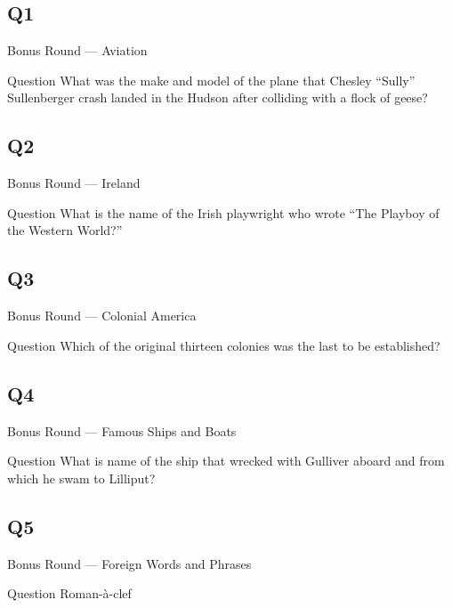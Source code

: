 \documentclass[11pt]{beamer}
\begin{document}
\subsection*{Q1}
\begin{frame}[t]{Bonus Round --- Aviation}
\vspace{-0.5em}
\begin{block}{Question}
What was the make and model of the plane that Chesley ``Sully'' Sullenberger crash landed in the Hudson after colliding with a flock of geese?
\end{block}
\end{frame}
\subsection*{Q2}
\begin{frame}[t]{Bonus Round --- Ireland}
\vspace{-0.5em}
\begin{block}{Question}
What is the name of the Irish playwright who wrote ``The Playboy of the Western World?''
\end{block}
\end{frame}
\subsection*{Q3}
\begin{frame}[t]{Bonus Round --- Colonial America}
\vspace{-0.5em}
\begin{block}{Question}
Which of the original thirteen colonies was the last to be established?
\end{block}
\end{frame}
\subsection*{Q4}
\begin{frame}[t]{Bonus Round --- Famous Ships and Boats}
\vspace{-0.5em}
\begin{block}{Question}
What is name of the ship that wrecked with Gulliver aboard and from which he swam to Lilliput?
\end{block}
\end{frame}
\subsection*{Q5}
\begin{frame}[t]{Bonus Round --- Foreign Words and Phrases}
\vspace{-0.5em}
\begin{block}{Question}
Roman-à-clef
\end{block}
\end{frame}
\end{document}
